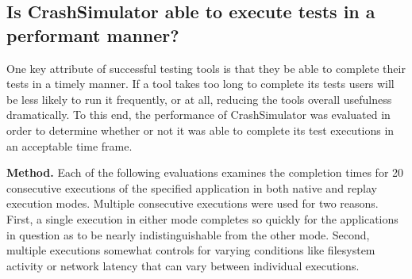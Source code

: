 
\subsection{Is CrashSimulator able to execute tests in a performant manner?}
\label{sec-perf}


One key attribute of successful testing tools is that they be able to
complete their tests in a timely manner.  If a tool takes too long to
complete its tests users will be less likely to run it frequently, or at
all, reducing the tools overall usefulness dramatically. To this end, the
performance of CrashSimulator was evaluated in order to determine whether
or not it was able to complete its test executions in an acceptable time
frame.  

{\bf Method.} Each of the following evaluations examines the completion
times for 20 consecutive executions of the specified application in both
native and replay execution modes.  Multiple consecutive executions were
used for two reasons.  First, a single execution in either mode completes
so quickly for the applications in question as to be nearly
indistinguishable from the other mode.  Second, multiple executions
somewhat controls for varying conditions like filesystem activity or
network latency that can vary between individual executions.  


